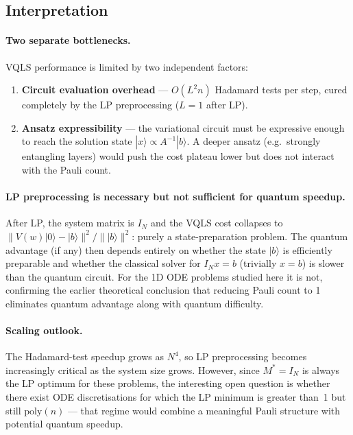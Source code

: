 \documentclass{article}
\begin{document}
\subsection*{Interpretation}

\paragraph{Two separate bottlenecks.}
VQLS performance is limited by two independent factors:
\begin{enumerate}
    \item \textbf{Circuit evaluation overhead} --- $O(L^2 n)$ Hadamard tests
    per step, cured completely by the LP preprocessing ($L=1$ after LP).
    \item \textbf{Ansatz expressibility} --- the variational circuit must be
    expressive enough to reach the solution state $|x\rangle \propto A^{-1}|b\rangle$.
    A deeper ansatz (e.g.\ strongly entangling layers) would push the cost
    plateau lower but does not interact with the Pauli count.
\end{enumerate}

\paragraph{LP preprocessing is necessary but not sufficient for quantum speedup.}
After LP, the system matrix is $I_N$ and the VQLS cost collapses to
$\|V(w)|0\rangle - |b\rangle\|^2 / \||b\rangle\|^2$: purely a state-preparation
problem.  The quantum advantage (if any) then depends entirely on whether the
state $|b\rangle$ is efficiently preparable and whether the classical solver for
$I_N x = b$ (trivially $x = b$) is slower than the quantum circuit.  For the
1D ODE problems studied here it is not, confirming the earlier theoretical
conclusion that reducing Pauli count to 1 eliminates quantum advantage along
with quantum difficulty.

\paragraph{Scaling outlook.}
The Hadamard-test speedup grows as $N^4$, so LP preprocessing becomes
increasingly critical as the system size grows.  However, since $M^*=I_N$ is
always the LP optimum for these problems, the interesting open question is
whether there exist ODE discretisations for which the LP minimum is greater
than~1 but still $\mathrm{poly}(n)$ --- that regime would combine a meaningful
Pauli structure with potential quantum speedup.
\end{document}
